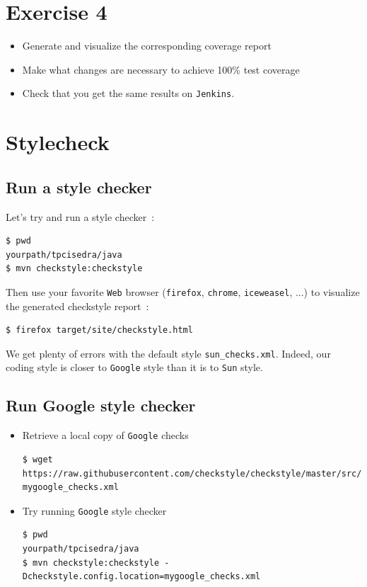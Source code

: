 \documentclass{article}
\begin{document}
\section{Exercise 4}
\begin{itemize}
\item Generate and visualize the corresponding coverage report
\item Make what changes are necessary to achieve 100\% test coverage
\item Check that you get the same results on \texttt{Jenkins}.
\end{itemize}

\section{Stylecheck}

\subsection{Run a style checker}

Let's try and run a style checker~:
\begin{lstlisting}
$ pwd
yourpath/tpcisedra/java
$ mvn checkstyle:checkstyle
\end{lstlisting}

Then use your favorite \texttt{Web} browser (\texttt{firefox}, \texttt{chrome}, \texttt{iceweasel}, ...) to visualize the generated checkstyle report~:
\begin{lstlisting}
$ firefox target/site/checkstyle.html
\end{lstlisting}

We get plenty of errors with the default style \texttt{sun\_checks.xml}.
Indeed, our coding style is closer to \texttt{Google} style than it is to \texttt{Sun} style.

\subsection{Run Google style checker}

\begin{itemize}
\item Retrieve a local copy of \texttt{Google} checks
\begin{lstlisting}[breaklines=true]
$ wget https://raw.githubusercontent.com/checkstyle/checkstyle/master/src/main/resources/google_checks.xml mygoogle_checks.xml
\end{lstlisting}
\item Try running \texttt{Google} style checker
\begin{lstlisting}
$ pwd
yourpath/tpcisedra/java
$ mvn checkstyle:checkstyle -Dcheckstyle.config.location=mygoogle_checks.xml
\end{lstlisting}
\end{itemize}
\end{document}
